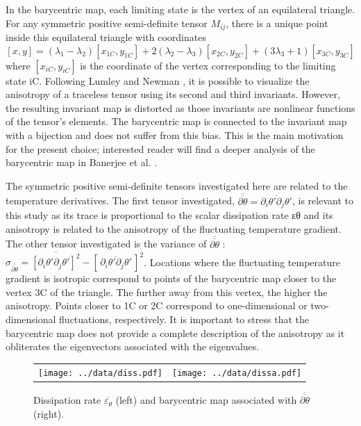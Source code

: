 \documentclass[review]{elsarticle}
\newcommand{\epst}{\varepsilon_\theta}
\begin{document}
In the barycentric map, each limiting state is the vertex of an equilateral triangle. For any symmetric positive semi-definite tensor $M_{ij}$, there is a unique point inside this equilateral triangle with coordinates
\begin{equation}
\left[ x,y \right] = \left( \lambda_1 - \lambda_2 \right) \left[ x_{1C},y_{1C} \right] + 2 \left( \lambda_2 - \lambda_3 \right) \left[ x_{2C},y_{2C} \right] + \left( 3\lambda_3 + 1 \right) \left[ x_{3C},y_{3C} \right]
\end{equation}
where $\left[x_{iC},y_{iC} \right]$ is the coordinate of the vertex corresponding to the limiting state iC. Following Lumley and Newman \cite{lumley1977return}, it is possible to visualize the anisotropy of a traceless tensor using its second and third invariants. However, the resulting invariant map is distorted as those invariants are nonlinear functions of the tensor’s elements. The barycentric map is connected to the invariant map with a bijection and does not suffer from this bias. This is the main motivation for the present choice; interested reader will find a deeper analysis of the barycentric map in Banerjee et al. \citep{banerjee2007presentation}.

The symmetric positive semi-definite tensors investigated here are related to the temperature derivatives. The first tensor investigated, $\overline{\overline{\partial \theta}} = \overline{\partial_i \theta' \partial_j \theta' }$, is relevant to this study as its trace is proportional to the scalar dissipation rate εθ and its anisotropy is related to the anisotropy of the fluctuating temperature gradient. The other tensor investigated is the variance of $\overline{\overline{\partial \theta}}$ : $\sigma_{\overline{\overline{\partial \theta}}} = \overline{\left[\partial_i \theta' \partial_j \theta' \right]^2 } - \left[ \, \overline{\partial_i \theta' \partial_j \theta' } \, \right]^2$. Locations where the fluctuating temperature gradient is isotropic correspond to points of the barycentric map closer to the vertex 3C of the triangle. The further away from this vertex, the higher the anisotropy. Points closer to 1C or 2C correspond to one-dimensional or two-dimensional fluctuations, respectively. It is important to stress that the barycentric map does not provide a complete description of the anisotropy as it obliterates the eigenvectors associated with the eigenvalues.

\begin{figure}[htbp]
\begin{center}
\begin{tabular}{cc}
\texttt{[image: ../data/diss.pdf]} & 
\texttt{[image: ../data/dissa.pdf]}
\end{tabular}
\end{center}
\caption{Dissipation rate $\overline{\epst}$ (left) and barycentric map associated with $\overline{\overline{\partial \theta}}$ (right).}
\label{fig-diss}
\end{figure}
\end{document}
